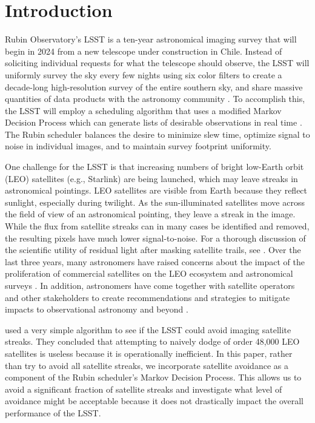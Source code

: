 \documentclass[twocolumn]{aastex631}
\begin{document}
\section{Introduction} \label{sec:intro}

Rubin Observatory's LSST is a ten-year astronomical imaging survey that will begin in 2024 from a new telescope under construction in Chile. Instead of soliciting individual requests for what the telescope should observe, the LSST will uniformly survey the sky every few nights using six color filters to create a decade-long high-resolution survey of the entire southern sky, and share massive quantities of data products with the astronomy community \citep{overview}. To accomplish this, the LSST will employ a scheduling algorithm that uses a modified Markov Decision Process which can generate lists of desirable observations in real time \citep{naghib19}. The Rubin scheduler balances the desire to minimize slew time, optimize signal to noise in individual images, and to maintain survey footprint uniformity.

One challenge for the LSST is that increasing numbers of bright low-Earth orbit (LEO) satellites (e.g., Starlink) are being launched, which may leave streaks in astronomical pointings. LEO satellites are visible from Earth because they reflect sunlight, especially during twilight. As the sun-illuminated satellites move across the field of view of an astronomical pointing, they leave a streak in the image. While the flux from satellite streaks can in many cases be identified and removed, the resulting pixels have much lower signal-to-noise. For a thorough discussion of the scientific utility of residual light after masking satellite trails, see \citet{hasan22}. Over the last three years, many astronomers have raised concerns about the impact of the proliferation of commercial satellites on the LEO ecosystem and astronomical surveys \citep{lawrence22,tyson20}. In addition, astronomers have come together with satellite operators and other stakeholders to create recommendations and strategies to mitigate impacts to observational astronomy and beyond \citep{satcon1,satcon2,dqs1,dqs2}.

\citet{tyson20} used a very simple algorithm to see if the LSST could avoid imaging satellite streaks. They concluded that attempting to naively dodge of order 48,000 LEO satellites is useless because it is operationally inefficient.
In this paper, rather than try to avoid all satellite streaks, we incorporate satellite avoidance as a component of the Rubin scheduler's Markov Decision Process. This allows us to avoid a significant fraction of satellite streaks and investigate what level of avoidance might be acceptable because it does not drastically impact the overall performance of the LSST.
\end{document}
